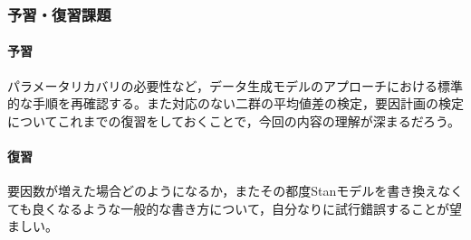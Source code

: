 \subsubsection{予習・復習課題}
\paragraph{予習}パラメータリカバリの必要性など，データ生成モデルのアプローチにおける標準的な手順を再確認する。また対応のない二群の平均値差の検定，要因計画の検定についてこれまでの復習をしておくことで，今回の内容の理解が深まるだろう。
\paragraph{復習}要因数が増えた場合どのようになるか，またその都度Stanモデルを書き換えなくても良くなるような一般的な書き方について，自分なりに試行錯誤することが望ましい。